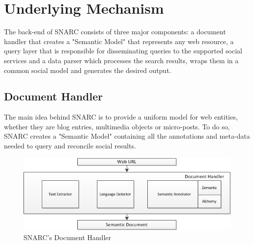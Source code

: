 \documentclass[oribibl]{llncs}
\begin{document}
\section{Underlying Mechanism}
The back-end of SNARC consists of three major components: a document handler that creates a "Semantic Model" that represents any web resource, a query layer that is responsible for disseminating queries to the supported social services and a data parser which processes the search results, wraps them in a common social model and generates the desired output.

\subsection{Document Handler}
The main idea behind SNARC is to provide a uniform model for web entities, whether they are blog entries, multimedia objects or micro-posts. To do so, SNARC creates a "Semantic Model" containing all the annotations and meta-data needed to query and reconcile social results. 
\begin{figure}[h!]
  \centering
    \includegraphics[scale=0.8]{architecture-part1.png} 
  \caption{SNARC's Document Handler}
\end{figure}
\end{document}
